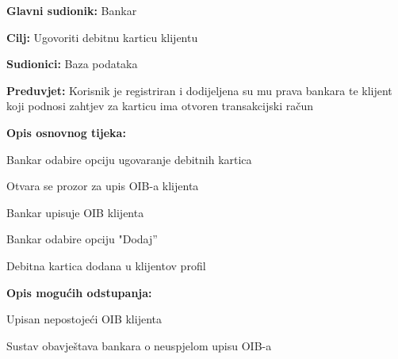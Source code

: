             
            \noindent {}
            \begin{packed_item}
            
              \item \textbf{Glavni sudionik: }Bankar
              \item  \textbf{Cilj:} Ugovoriti debitnu karticu klijentu
              \item  \textbf{Sudionici:} Baza podataka
              \item  \textbf{Preduvjet:} Korisnik je registriran i dodijeljena su mu prava bankara te klijent koji podnosi zahtjev za karticu ima otvoren transakcijski račun 
              \item  \textbf{Opis osnovnog tijeka:}
              
              \item[] \begin{packed_enum}
            
                \item Bankar odabire opciju ugovaranje debitnih kartica
                \item Otvara se prozor za upis OIB-a klijenta
                \item Bankar upisuje OIB klijenta
                \item Bankar odabire  opciju "Dodaj”
                \item Debitna kartica dodana u klijentov profil
              \end{packed_enum}
              
              \item  \textbf{Opis mogućih odstupanja:}
              
              \item[] \begin{packed_item}
            
                \item[2.a] Upisan nepostojeći OIB klijenta
                \item[] \begin{packed_enum}
                  
                  \item Sustav obavještava bankara o neuspjelom upisu OIB-a
                  
                \end{packed_enum}
                
              \end{packed_item}
            \end{packed_item}
            
